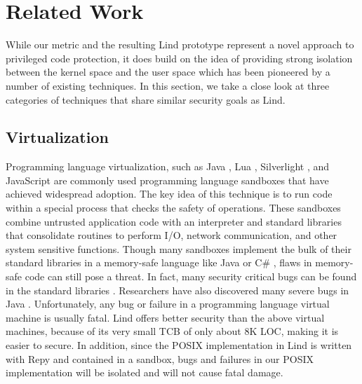 \section{Related Work}
\label{sec.related_work}

While our metric and the resulting Lind prototype represent a novel approach 
to privileged code protection, it does build on the idea of providing 
strong isolation between the kernel space and the user space 
which has been pioneered by a number of existing techniques. 
In this section, we take a close look at three categories of techniques 
that share similar security goals as Lind.

\subsection{Virtualization}

Programming language virtualization, such as Java \cite{Java}, Lua \cite{Lua}, Silverlight \cite{Silverlight}, 
and JavaScript \cite{JavaScript} are commonly used programming language sandboxes 
that have achieved widespread adoption. The key idea of this technique is 
to run code within a special process that checks the safety of operations. 
These sandboxes combine untrusted application code with an interpreter 
and standard libraries that consolidate routines to perform I/O, network communication, 
and other system sensitive functions. Though many sandboxes implement 
the bulk of their standard libraries in a memory-safe language like Java or C\# \cite{CSharp}, 
flaws in memory-safe code can still pose a threat. In fact, many security critical bugs 
can be found in the standard libraries \cite{JavaBugs}. Researchers have also discovered 
many severe bugs in Java \cite{Java-Lessons}.  Unfortunately, any bug or failure 
in a programming language virtual machine is usually fatal. Lind offers better security 
than the above virtual machines, because of its very small TCB of only about 8K LOC, 
making it is easier to secure. In addition, since the POSIX implementation in Lind is 
written with Repy and contained in a sandbox, bugs and failures in our POSIX implementation 
will be isolated and will not cause fatal damage.

